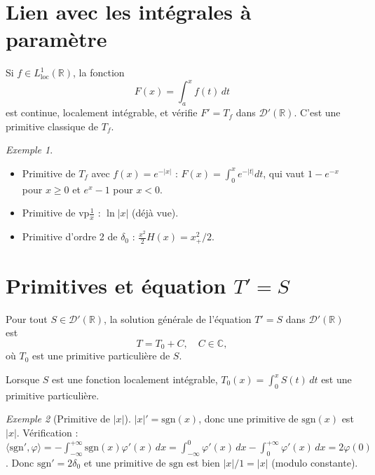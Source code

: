 \documentclass[12pt,a4paper,openany]{book}
\theoremstyle{definition}
\theoremstyle{plain}
\theoremstyle{remark}
\newtheorem*{example}{Exemple}
\newenvironment{exemple}{\begin{example}}{\end{example}}
\begin{document}
	\section{Lien avec les intégrales à paramètre}
	
	\begin{theorem}
		Si $f \in L^1_{\text{loc}}(\mathbb{R})$, la fonction
		\[
		F(x) = \int_a^x f(t)\,dt
		\]
		est continue, localement intégrable, et vérifie $F' = T_f$ dans $\mathcal{D}'(\mathbb{R})$. C'est une primitive classique de $T_f$.
	\end{theorem}
	
	\begin{exemple}
		\begin{itemize}
			\item Primitive de $T_f$ avec $f(x) = e^{-|x|}$ : $F(x) = \int_0^x e^{-|t|}dt$, qui vaut $1 - e^{-x}$ pour $x \geq 0$ et $e^x - 1$ pour $x < 0$.
			\item Primitive de $\mathrm{vp}\frac{1}{x}$ : $\ln|x|$ (déjà vue).
			\item Primitive d'ordre 2 de $\delta_0$ : $\frac{x^2}{2}H(x) = x_+^2/2$.
		\end{itemize}
	\end{exemple}
	
	\section{Primitives et équation \texorpdfstring{$T' = S$}{T'=S}}
	
	\begin{theorem}[Résolution de $T' = S$]
		Pour tout $S \in \mathcal{D}'(\mathbb{R})$, la solution générale de l'équation $T' = S$ dans $\mathcal{D}'(\mathbb{R})$ est
		\[
		T = T_0 + C, \quad C \in \mathbb{C},
		\]
		où $T_0$ est une primitive particulière de $S$.
		
		Lorsque $S$ est une fonction localement intégrable, $T_0(x) = \int_0^x S(t)\,dt$ est une primitive particulière.
	\end{theorem}
	
	\begin{exemple}[Primitive de $|x|$]
		$|x|' = \mathrm{sgn}(x)$, donc une primitive de $\mathrm{sgn}(x)$ est $|x|$.
		Vérification : $\langle \mathrm{sgn}', \varphi\rangle = -\int_{-\infty}^{+\infty}\mathrm{sgn}(x)\varphi'(x)\,dx = \int_{-\infty}^0\varphi'(x)\,dx - \int_0^{+\infty}\varphi'(x)\,dx = 2\varphi(0)$.
		Donc $\mathrm{sgn}'= 2\delta_0$ et une primitive de $\mathrm{sgn}$ est bien $|x|/1 = |x|$ (modulo constante).
	\end{exemple}
	
\end{document}

